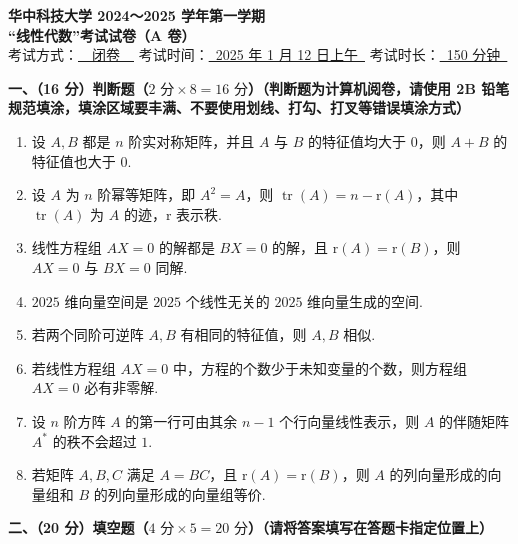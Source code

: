 \documentclass[a4paper,11pt]{ctexart}
\newcommand{\tr}{\operatorname{tr}}
\newcommand{\rk}{\mathrm{r}}
\begin{document}
\begin{center}
  {\Large\bfseries 华中科技大学 2024～2025 学年第一学期}\\[0.4em]
  {\Large\bfseries “线性代数”考试试卷（A 卷）}\\[1.0em]
  {\normalsize
    考试方式：\underline{\ \ 闭卷\ \ }\quad
    考试时间：\underline{\ 2025 年 1 月 12 日上午\ }\quad
    考试时长：\underline{\ 150 分钟\ }
  }
\end{center}

\vspace{0.8em}

\textbf{一、（16 分）判断题（$2\text{ 分}\times 8 = 16\text{ 分}$）（判断题为计算机阅卷，请使用 2B 铅笔规范填涂，填涂区域要丰满、不要使用划线、打勾、打叉等错误填涂方式）}

\begin{enumerate}[label=\arabic*., leftmargin=2em, itemsep=0.7em, topsep=0.6em]
  \item 设 $A, B$ 都是 $n$ 阶实对称矩阵，并且 $A$ 与 $B$ 的特征值均大于 $0$，则 $A+B$ 的特征值也大于 $0$.

  \item 设 $A$ 为 $n$ 阶幂等矩阵，即 $A^2 = A$，则 $\tr(A) = n - \rk(A)$，其中 $\tr(A)$ 为 $A$ 的迹，$\rk$ 表示秩.

  \item 线性方程组 $AX = 0$ 的解都是 $BX = 0$ 的解，且 $\rk(A) = \rk(B)$，则 $AX = 0$ 与 $BX = 0$ 同解.

  \item $2025$ 维向量空间是 $2025$ 个线性无关的 $2025$ 维向量生成的空间.

  \item 若两个同阶可逆阵 $A, B$ 有相同的特征值，则 $A, B$ 相似.

  \item 若线性方程组 $AX = 0$ 中，方程的个数少于未知变量的个数，则方程组 $AX = 0$ 必有非零解.

  \item 设 $n$ 阶方阵 $A$ 的第一行可由其余 $n-1$ 个行向量线性表示，则 $A$ 的伴随矩阵 $A^*$ 的秩不会超过 $1$.

  \item 若矩阵 $A, B, C$ 满足 $A = BC$，且 $\rk(A) = \rk(B)$，则 $A$ 的列向量形成的向量组和 $B$ 的列向量形成的向量组等价.
\end{enumerate}

\vspace{1.0em}

\textbf{二、（20 分）填空题（$4\text{ 分}\times 5 = 20\text{ 分}$）（请将答案填写在答题卡指定位置上）}
\end{document}
